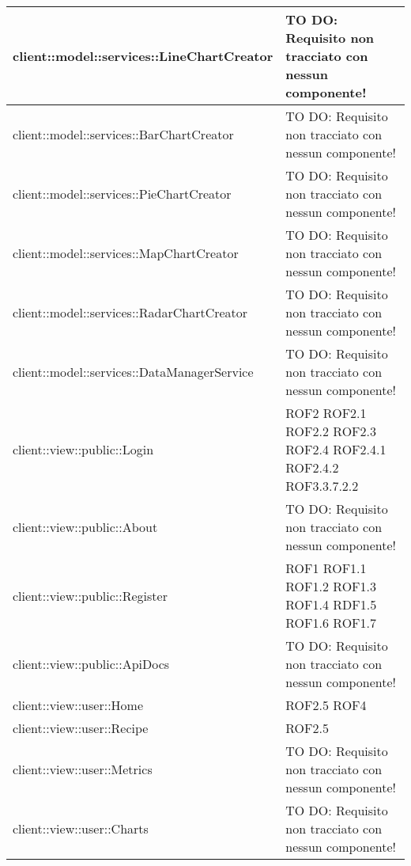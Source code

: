 \begin{center}
\begin{longtable}{| p{11cm} | p{2.5cm} |}
\hline
client::model::services::LineChartCreator & TO DO: Requisito non tracciato con nessun componente! \\
\hline
client::model::services::BarChartCreator & TO DO: Requisito non tracciato con nessun componente! \\
\hline
client::model::services::PieChartCreator & TO DO: Requisito non tracciato con nessun componente! \\
\hline
client::model::services::MapChartCreator & TO DO: Requisito non tracciato con nessun componente! \\
\hline
client::model::services::RadarChartCreator & TO DO: Requisito non tracciato con nessun componente! \\
\hline
client::model::services::DataManagerService & TO DO: Requisito non tracciato con nessun componente! \\
\hline
client::view::public::Login & ROF2 \newline ROF2.1 \newline ROF2.2 \newline ROF2.3 \newline ROF2.4 \newline ROF2.4.1 \newline ROF2.4.2 \newline ROF3.3.7.2.2 \\
\hline
client::view::public::About & TO DO: Requisito non tracciato con nessun componente! \\
\hline
client::view::public::Register & ROF1 \newline ROF1.1 \newline ROF1.2 \newline ROF1.3 \newline ROF1.4 \newline RDF1.5 \newline ROF1.6 \newline ROF1.7 \\
\hline
client::view::public::ApiDocs & TO DO: Requisito non tracciato con nessun componente! \\
\hline
client::view::user::Home & ROF2.5 \newline ROF4 \\
\hline
client::view::user::Recipe & ROF2.5 \\
\hline
client::view::user::Metrics & TO DO: Requisito non tracciato con nessun componente! \\
\hline
client::view::user::Charts & TO DO: Requisito non tracciato con nessun componente! \\

\end{longtable}
\end{center}
